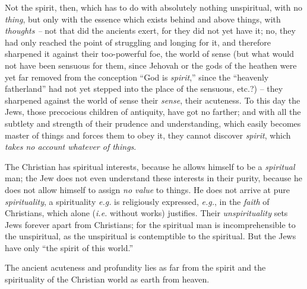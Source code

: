 \documentclass[12pt,a4paper]{book}
\begin{document}
Not the spirit, then, which has to do with absolutely nothing unspiritual, 
with no \textit{thing}, but only with the essence which exists behind and 
above things, with \textit{thoughts --} not that did the ancients exert, for 
they did not yet have it; no, they had only reached the point of struggling 
and longing for it, and therefore sharpened it against their too-powerful foe, 
the world of sense (but what would not have been sensuous for them, since 
Jehovah or the gods of the heathen were yet far removed from the conception 
``God is \textit{spirit},'' since the ``heavenly fatherland'' had not yet 
stepped into the place of the sensuous, etc.?) -- they sharpened against the 
world of sense their \textit{sense}, their acuteness. To this day the Jews, 
those precocious children of antiquity, have got no farther; and with all the 
subtlety and strength of their prudence and understanding, which easily 
becomes master of things and forces them to obey it, they cannot discover 
\textit{spirit}, which \textit{takes no account whatever of things}.

The Christian has spiritual interests, because he allows himself to be a 
\textit{spiritual} man; the Jew does not even understand these interests in 
their purity, because he does not allow himself to assign \textit{no value} to 
things. He does not arrive at pure \textit{spirituality}, a spirituality 
\textit{e.g.} is religiously expressed, \textit{e.g.}, in the \textit{faith} 
of Christians, which alone (\textit{i.e.} without works) justifies. Their 
\textit{unspirituality} sets Jews forever apart from Christians; for the 
spiritual man is incomprehensible to the unspiritual, as the unspiritual is 
contemptible to the spiritual. But the Jews have only ``the spirit of this 
world.''

The ancient acuteness and profundity lies as far from the spirit and the 
spirituality of the Christian world as earth from heaven.
\end{document}
